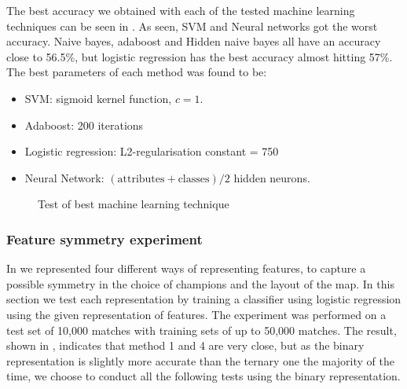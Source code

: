 The best accuracy we obtained with each of the tested machine learning techniques can be seen in . As seen, SVM and Neural networks got the worst accuracy. Naive bayes, adaboost and Hidden naive bayes all have an accuracy close to 56.5\%, but logistic regression has the best accuracy almost hitting 57\%.
The best parameters of each method was found to be:
\begin{itemize}
\item SVM: sigmoid kernel function, $c = 1$.
\item Adaboost: 200 iterations
\item Logistic regression: L2-regularisation constant = 750
\item Neural Network: $(\text{attributes} + \text{classes}) / 2$ hidden neurons.
\end{itemize}

\begin{figure}[!htb]
  \caption{Test of best machine learning technique}\label{fig:besttech}
\end{figure}

\subsubsection{Feature symmetry experiment}
In  we represented four different ways of representing features, to capture a possible symmetry in the choice of champions and the layout of the map. In this section we test each representation by training a classifier using logistic regression using the given representation of features. The experiment was performed on a test set of 10,000 matches with training sets of up to 50,000 matches. The result, shown in , indicates that method 1 and 4 are very close, but as the binary representation is slightly more accurate than the ternary one the majority of the time, we choose to conduct all the following tests using the binary representation. 

